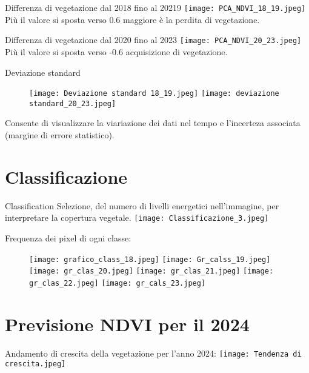 \documentclass[10pt]{beamer}
\begin{document}
\begin{frame}
Differenza di vegetazione dal 2018 fino al 20219
\texttt{[image: PCA\_NDVI\_18\_19.jpeg]}
Più il valore si sposta verso 0.6 maggiore è la perdita di vegetazione.
\end{frame}
\begin{frame}
Differenza di vegetazione dal 2020 fino al 2023
\texttt{[image: PCA\_NDVI\_20\_23.jpeg]}
Più il valore si sposta verso -0.6 acquisizione di vegetazione.
\end{frame}   

\begin{frame}{Deviazione standard}
\begin{figure}
        \centering
        \texttt{[image: Deviazione standard 18\_19.jpeg]}
        \texttt{[image: deviazione standard\_20\_23.jpeg]} 
    \end{figure}
      Consente di visualizzare la viariazione dei dati nel tempo e l'incerteza associata (margine di errore statistico).
\end{frame}

\section{Classificazione}
\begin{frame}{Classification}
Selezione, del numero di livelli energetici nell'immagine, per interpretare la copertura vegetale.
\texttt{[image: Classificazione\_3.jpeg]}
\end{frame}
\begin{frame}
Frequenza dei pixel di ogni classe:
\begin{figure}
        \centering
        \texttt{[image: grafico\_class\_18.jpeg]}
        \texttt{[image: Gr\_calss\_19.jpeg]} 
        \texttt{[image: gr\_clas\_20.jpeg]}
        \texttt{[image: gr\_clas\_21.jpeg]}
        \texttt{[image: gr\_clas\_22.jpeg]} 
        \texttt{[image: gr\_cals\_23.jpeg]}
    \end{figure}
\end{frame}

\section{Previsione NDVI per il 2024}
\begin{frame}{Andamento di crescita della vegetazione per l'anno 2024:}
\centering
\texttt{[image: Tendenza di crescita.jpeg]}  
\end{frame}
\end{document}
